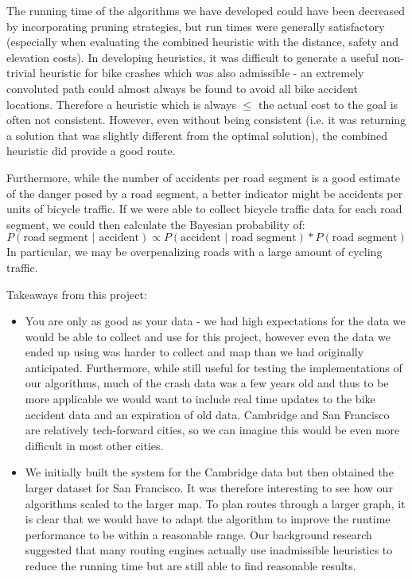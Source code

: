 \documentclass[11pt]{article}
\begin{document}
The running time of the algorithms we have developed could have been decreased by incorporating pruning strategies, but run times were generally satisfactory (especially when evaluating the combined heuristic with the distance, safety and elevation costs). In developing heuristics, it was difficult to generate a useful non-trivial heuristic for bike crashes which was also admissible - an extremely convoluted path could almost always be found to avoid all bike accident locations. Therefore a heuristic which is always $\le$ the actual cost to the goal is often not consistent. However, even without being consistent (i.e. it was returning a solution that was slightly different from the optimal solution), the combined heuristic did provide a good route.

\par
Furthermore, while the number of accidents per road segment is a good estimate of the danger posed by a road segment, a better indicator might be accidents per units of bicycle traffic. If we were able to collect bicycle traffic data for each road segment, we could then calculate the Bayesian probability of:
\begin{equation}
P(\text{road segment $\vert$ accident}) \propto P(\text{accident $\vert$ road segment}) * P(\text{road segment})
\end{equation}In particular, we may be overpenalizing roads with a large amount of cycling traffic.
\par

\par
\noindent Takeaways from this project:
\begin{itemize}
\item You are only as good as your data - we had high expectations for the data we would be able to collect and use for this project, however even the data we ended up using was harder to collect and map than we had originally anticipated. Furthermore, while still useful for testing the implementations of our algorithms, much of the crash data was a few years old and thus to be more applicable we would want to include real time updates to the bike accident data and an expiration of old data. Cambridge and San Francisco are relatively tech-forward cities, so we can imagine this would be even more difficult in most other cities.
\item We initially built the system for the Cambridge data but then obtained the larger dataset for San Francisco. It was therefore interesting to see how our algorithms scaled to the larger map. To plan routes through a larger graph, it is clear that we would have to adapt the algorithm to improve the runtime performance to be within a reasonable range. Our background research suggested that many routing engines actually use inadmissible heuristics to reduce the running time but are still able to find reasonable results. 
\end{itemize}
\end{document}
